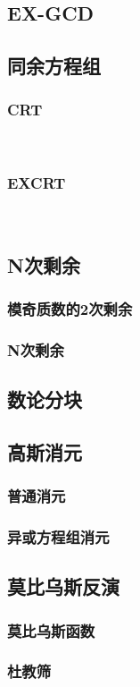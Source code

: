 \documentclass[twocolumn,a4]{article}
\newcommand{\addcpp}[1]{}
\begin{document}
	\subsection{EX-GCD}
	\subsection{同余方程组}
		\subsubsection{CRT}
​			%
​		\subsubsection{EXCRT}
​			\addcpp{math/EXCRT}
	\subsection{N次剩余}
		\subsubsection{模奇质数的2次剩余}
			\addcpp{math/Quadratic_residue}
		\subsubsection{N次剩余}
	\subsection{数论分块}
	\subsection{高斯消元}
		\subsubsection{普通消元}
		\subsubsection{异或方程组消元}
	\subsection{莫比乌斯反演}
		\subsubsection{莫比乌斯函数}
		\subsubsection{杜教筛}
\end{document}
